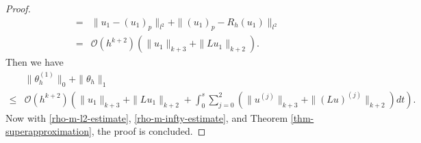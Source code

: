 \documentclass[onefignum,onetabnum]{siamart171218}
\begin{document}
\begin{proof}
\begin{align*}
 = & \| u_1-(u_1)_p \|_{l^2}  + \|(u_1)_p -R_h(u_1)\|_{l^2} \\
 = & \mathcal O(h^{k+2})(\|u_1\|_{k+3}+\|Lu_1\|_{k+2}).
\end{align*}
Then we have
\begin{equation}
\begin{aligned}
& \|\theta_h^{(1)}\|_{0} +\|\theta_h\|_{1} \\
\leq & \mathcal O(h^{k+2})  \left( \|u_1\|_{k+3}+\|Lu_1\|_{k+2} + \int_0^s \sum_{j=0}^2(\|u^{(j)}\|_{k+3}+\|(Lu)^{(j)}\|_{k+2}) dt \right).
\end{aligned}
\end{equation}
Now with \eqref{rho-m-l2-estimate},  \eqref{rho-m-infty-estimate}, and Theorem \ref{thm-superapproximation}, the proof is concluded.
\end{proof}
\end{document}
